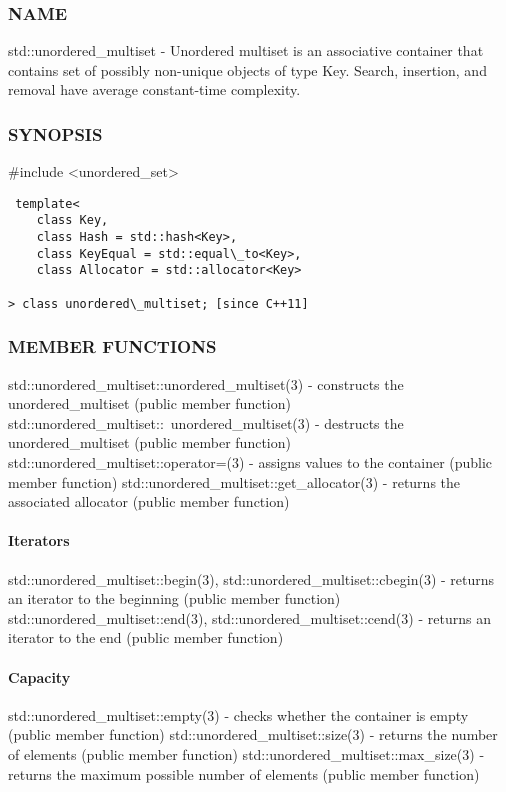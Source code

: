 \subsubsection{NAME}
std::unordered\_multiset - Unordered multiset is an associative container that contains set of possibly non-unique objects of type Key. Search, insertion, and removal have average constant-time complexity.

\subsubsection{SYNOPSIS}
\#include <unordered\_set>

\begin{lstlisting}
 template<
    class Key,
    class Hash = std::hash<Key>,
    class KeyEqual = std::equal\_to<Key>,
    class Allocator = std::allocator<Key>

> class unordered\_multiset; [since C++11]
\end{lstlisting}

\subsubsection{MEMBER FUNCTIONS}
std::unordered\_multiset::unordered\_multiset(3) - constructs the unordered\_multiset  (public member function)
std::unordered\_multiset::~unordered\_multiset(3) - destructs the unordered\_multiset  (public member function)
std::unordered\_multiset::operator=(3) - assigns values to the container   (public member function)
std::unordered\_multiset::get\_allocator(3) - returns the associated allocator   (public member function)
\paragraph{Iterators}
std::unordered\_multiset::begin(3), std::unordered\_multiset::cbegin(3) - returns an iterator to the beginning   (public member function)
std::unordered\_multiset::end(3), std::unordered\_multiset::cend(3) - returns an iterator to the end   (public member function)
\paragraph{Capacity}
std::unordered\_multiset::empty(3) - checks whether the container is empty   (public member function)
std::unordered\_multiset::size(3) - returns the number of elements   (public member function)
std::unordered\_multiset::max\_size(3) - returns the maximum possible number of elements   (public member function)
